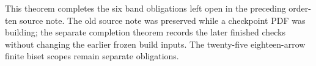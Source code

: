 \begin{remark*}
This theorem completes the six band obligations left open
in the preceding order-ten source note. The old source note
was preserved while a checkpoint PDF was building; the
separate completion theorem records the later finished
checks without changing the earlier frozen build inputs.
The twenty-five eighteen-arrow finite biset scopes remain
separate obligations.
\end{remark*}
